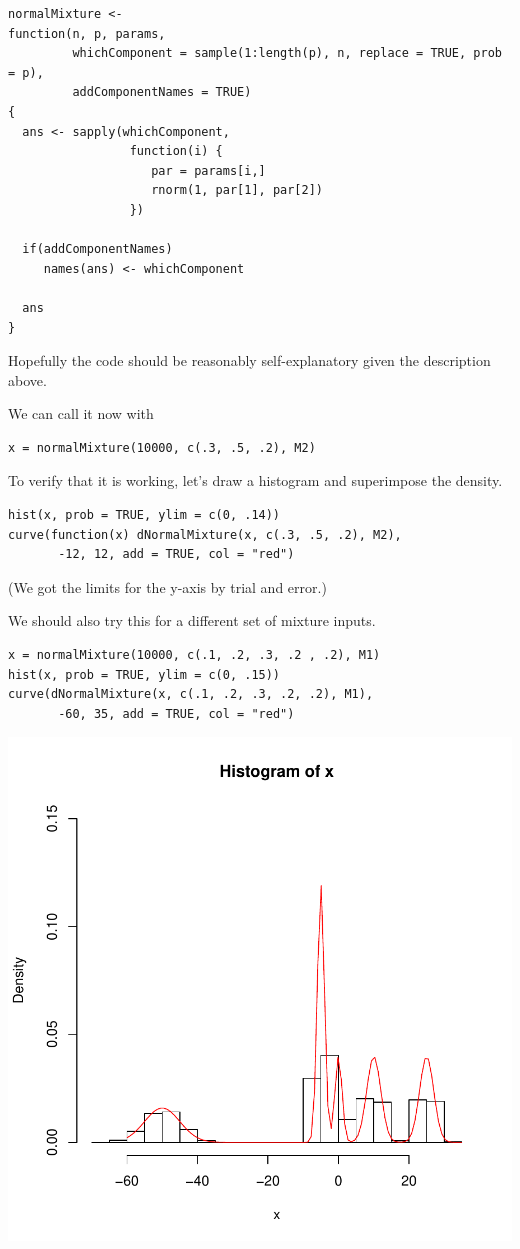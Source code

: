 \documentclass{article}
\begin{document}
\begin{description}
\begin{verbatim}
normalMixture <-
function(n, p, params,
         whichComponent = sample(1:length(p), n, replace = TRUE, prob = p),
         addComponentNames = TRUE)
{
  ans <- sapply(whichComponent,
                 function(i) {
                    par = params[i,]
                    rnorm(1, par[1], par[2])
                 })

  if(addComponentNames)
     names(ans) <- whichComponent

  ans
}
\end{verbatim}
Hopefully the code should be reasonably self-explanatory given the
description above.

We can call it now with
\begin{verbatim}
x = normalMixture(10000, c(.3, .5, .2), M2)
\end{verbatim}
To verify that it is working, let's draw a histogram and superimpose
the  density.
\begin{verbatim}
hist(x, prob = TRUE, ylim = c(0, .14))
curve(function(x) dNormalMixture(x, c(.3, .5, .2), M2), 
       -12, 12, add = TRUE, col = "red")
\end{verbatim}
(We got the limits for the y-axis by trial and error.)

We should also try this for a different set of mixture inputs.
\begin{verbatim}
x = normalMixture(10000, c(.1, .2, .3, .2 , .2), M1)
hist(x, prob = TRUE, ylim = c(0, .15))
curve(dNormalMixture(x, c(.1, .2, .3, .2, .2), M1), 
       -60, 35, add = TRUE, col = "red")
\end{verbatim}

\includegraphics{images/mixtureSample1.pdf}


\end{description}
\end{document}
